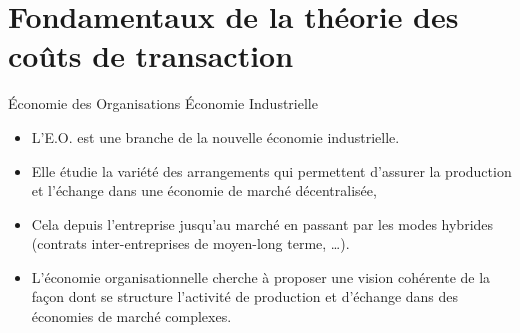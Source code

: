 \section{Fondamentaux de la théorie des coûts de transaction}
\frame{\sectionpage}
\begin{frame}[allowframebreaks]{Économie des Organisations Économie Industrielle}
    \begin{itemize}
    \item L'E.O. est une branche de la nouvelle économie industrielle.
    \item Elle étudie la variété des arrangements qui permettent d’assurer la production et l’échange dans une économie de marché décentralisée,
    \item Cela depuis l’entreprise jusqu’au marché en passant par les modes hybrides (contrats inter-entreprises de moyen-long terme, \ldots).
    \item L’économie organisationnelle cherche à proposer une vision cohérente de la façon dont se structure l’activité de production et d’échange dans des économies de marché complexes.
    \end{itemize}
\end{frame}
